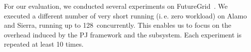 \documentclass[conference]{IEEEtran}
\begin{document}


For our \cc evaluation, we conducted several experiments on
FutureGrid~\cite{fg}. We executed a different number of very short running
(i.\,e. zero workload) \cus on Alamo and Sierra, running up to 128\,\cus 
concurrently.  This enables us to focus on the overhead induced
by the PJ framework and the \cc subsystem. Each experiment is
repeated at least 10 times.






\end{document}
